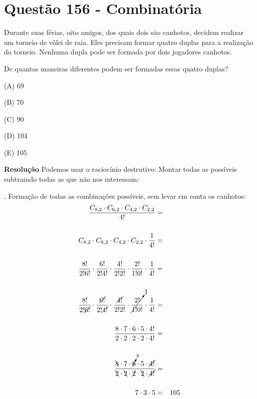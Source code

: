 \section{Questão 156 - Combinatória}

Durante suas férias, oito amigos, dos quais dois são canhotos, decidem realizar um torneio de vôlei de raia.
Eles precisam formar quatro duplas para a realização do torneio. Nenhuma dupla pode ser formada por dois jogadores canhotos.

De quantas maneiras diferentes podem ser formadas essas quatro duplas?

\noindent (A)  69

\noindent (B)  70

\noindent (C)  90

\noindent (D)  104

\noindent (E) 105

\textbf{Resolução}
Podemos usar o raciocínio destrutivo: Montar todas as possíveis subtraindo todas as que não nos interessam:

\renewcommand{\CancelColor}{\color{red}}

. Formação de todas as combinações possíveis, sem levar em conta os canhotos: 
\begin{eqnarray*}
\dfrac{C_{8, 2} \cdot C_{6, 2} \cdot C_{4, 2} \cdot C_{2, 2}  }{4!} &=& \\
\\
C_{8, 2} \cdot C_{6, 2} \cdot C_{4, 2} \cdot C_{2, 2}  \cdot \dfrac{1}{4!} &=& \\
\\
\dfrac{8!}{2! 6!} \cdot \dfrac{6!}{2! 4!} \cdot \dfrac{4!}{2! 2!} \cdot \dfrac{2!}{1! 0!} \cdot
 \dfrac{1}{4!}  &=& \\
\\
\dfrac{8!}{2! \cancel{6!}} \cdot \dfrac{\cancel{6!}}{2! \cancel{4!}} \cdot \dfrac{\cancel{4!}}{2! 2!} \cdot \cancelto{1}{\dfrac{2!}{1! 0!}} \cdot \dfrac{1}{4!}  &=& \\
\\
\dfrac{8 \cdot 7 \cdot 6 \cdot 5 \cdot 4!}{2 \cdot 2 \cdot 2 \cdot 2 \cdot 4!}  &=& \\
\\
\dfrac{\bcancel{8} \cdot 7 \cdot \cancelto{3}{6} \cdot 5 \cdot \cancel{4!}}{\bcancel{2} \cdot \bcancel{2} \cdot \cancel{2} \cdot \bcancel{2} \cdot \cancel{4!}}  &=& \\
\\
7 \cdot 3 \cdot 5  &=& 105
\end{eqnarray*}

